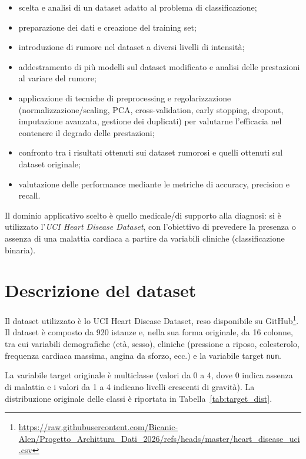\documentclass[12pt]{article}
\begin{document}
\begin{itemize}
    \item{scelta e analisi di un dataset adatto al problema di classificazione};
    \item preparazione dei dati e creazione del training set;
    \item introduzione di rumore nel dataset a diversi livelli di intensità;
    \item addestramento di più modelli sul dataset modificato e analisi delle prestazioni al variare del rumore;
    \item applicazione di tecniche di preprocessing e regolarizzazione (normalizzazione/scaling, PCA, cross-validation, early stopping, dropout, imputazione avanzata, gestione dei duplicati) per valutarne l'efficacia nel contenere il degrado delle prestazioni;
    \item confronto tra i risultati ottenuti sui dataset rumorosi e quelli ottenuti sul dataset originale;
    \item valutazione delle performance mediante le metriche di accuracy, precision e recall.
\end{itemize}

Il dominio applicativo scelto è quello medicale/di supporto alla diagnosi: si è utilizzato l'\emph{UCI Heart Disease Dataset}, con l'obiettivo di prevedere la presenza o assenza di una malattia cardiaca a partire da variabili cliniche (classificazione binaria).

\newpage
\section{Descrizione del dataset}

Il dataset utilizzato è lo UCI Heart Disease Dataset, reso disponibile su GitHub\footnote{\url{https://raw.githubusercontent.com/Bicanic-Alen/Progetto_Archittura_Dati_2026/refs/heads/master/heart_disease_uci.csv}}. Il dataset è composto da 920 istanze e, nella sua forma originale, da 16 colonne, tra cui variabili demografiche (età, sesso), cliniche (pressione a riposo, colesterolo, frequenza cardiaca massima, angina da sforzo, ecc.) e la variabile target \texttt{num}.

La variabile target originale è multiclasse (valori da 0 a 4, dove 0 indica assenza di malattia e i valori da 1 a 4 indicano livelli crescenti di gravità). La distribuzione originale delle classi è riportata in Tabella~\ref{tab:target_dist}.
\end{document}
